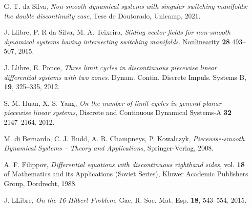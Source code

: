\documentclass[12pt]{article}
\begin{document}
\begin{thebibliography}{99}

 G. T. da Silva, {\it Non-smooth dynamical systems with singular switching manifolds: the double discontinuity case}, Tese de Doutorado, Unicamp, 2021.

 J. Llibre, P. R da Silva, M. A. Teixeira, {\it Sliding vector fields for non-smooth dynamical systems having intersecting switching manifolds}. Nonlinearity {\bf 28} 493--507, 2015.

J. Llibre, E. Ponce, {\it Three limit cycles in discontinuous piecewise linear differential systems with two zones}. Dynam. Contin. Discrete Impuls. Systems B, {\bf 19}, 325--335, 2012.

 S.-M. Huan, X.-S. Yang, {\it On the number of limit cycles in general planar piecewise linear systems}, Discrete and Continuous Dynamical Systems-A {\bf 32} 2147--2164, 2012.


 {\sc M. di Bernardo, C. J. Budd, A. R. Champneys, P. Kowalczyk}, {\it Piecewise-smooth Dynamical Systems -- Theory and Applications}, Springer-Verlag, 2008.





 {\sc A. F. Filippov}, {\it Differential equations with discontinuous righthand sides}, vol. {\bf 18} of Mathematics and its Applications (Soviet Series), Kluwer Academic Publishers Group, Dordrecht, 1988.


 J. LLibre, {\it On the 16-Hilbert Problem}, Gac. R. Soc. Mat. Esp. {\bf 18}, 543--554, 2015.


\end{thebibliography}
\end{document}
